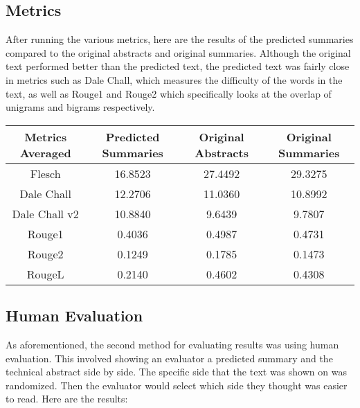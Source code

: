 \documentclass[11pt,a4paper]{article}
\begin{document}
\subsection{Metrics}

\indent \indent After running the various metrics, here are the results of the predicted summaries compared to the original abstracts and original summaries. Although the original text performed better than the predicted text, the predicted text was fairly close in metrics such as Dale Chall, which measures the difficulty of the words in the text, as well as Rouge1 and Rouge2 which specifically looks at the overlap of unigrams and bigrams respectively.

\begin{table}[!htbp]
  \hspace{1.1cm}
  \begin{tabular}{|c | c | c | c|} 
    \hline
    Metrics Averaged & Predicted Summaries & Original Abstracts & Original Summaries \\ [1ex] 
    \hline\hline
    Flesch & 16.8523 & 27.4492 & 29.3275 \\ [1ex]
    \hline
    Dale Chall & 12.2706 & 11.0360 & 10.8992 \\ [1ex]
    \hline
    Dale Chall v2 & 10.8840 & 9.6439 & 9.7807 \\ [1ex]
    \hline
    Rouge1 & 0.4036 & 0.4987 & 0.4731 \\ [1ex]
    \hline
    Rouge2 & 0.1249 & 0.1785 & 0.1473 \\ [1ex] 
    \hline
    RougeL & 0.2140 & 0.4602 & 0.4308 \\ [1ex] 
    \hline
  \end{tabular}
\end{table}    


\subsection{Human Evaluation}

\indent \indent As aforementioned, the second method for evaluating results was using human evaluation. This involved showing an evaluator a predicted summary and the technical abstract side by side. The specific side that the text was shown on was randomized. Then the evaluator would select which side they thought was easier to read. Here are the results:

\end{document}
